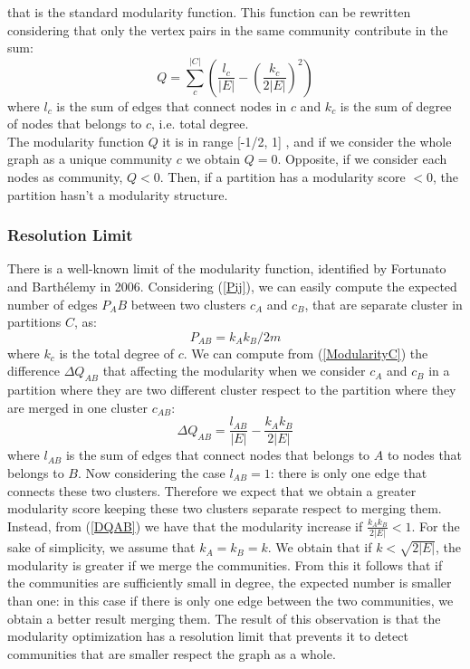 that is the standard modularity function. This function can be rewritten considering that only the vertex pairs in the same community contribute in the sum: 
\begin{equation}\label{ModularityC}
Q =  \sum_{c}^{|C|} \left( \frac{l_c}{|E|} - \left( \frac{k_c}{2|E|}\right) ^2 \right)
\end{equation}
where $l_c$ is the sum of edges that connect nodes in $c$ and $k_c$ is the sum of degree of nodes that belongs to $c$, i.e. total degree. \\
The modularity function $Q$ it is in range [-1/2, 1] \cite{bounds}, and if we consider the whole graph as a unique community $c$ we obtain $Q = 0$. Opposite, if we consider each nodes as community, $Q < 0$. Then, if a partition has a modularity score $<0$, the partition hasn't a modularity structure. 
\subsubsection{Resolution Limit}
There is a well-known limit of the modularity function, identified by Fortunato and Barthélemy \cite{resolution-limit} in 2006. Considering (\ref{Pij}), we can easily compute the expected number of edges $P_AB$ between two clusters $c_A$ and $c_B$, that are separate cluster in partitions $C$, as:
\begin{equation}
P_{AB} = k_A k_B /2m 
\end{equation}
where $k_c$ is the total degree of $c$.
We can compute from (\ref{ModularityC}) the difference $\Delta Q_{AB}$ that affecting the modularity when we consider $c_A$ and $c_B$ in a partition where they are two different cluster respect to the partition where they are merged in one cluster $c_{AB}$:
\begin{equation}\label{DQAB}
\Delta Q_{AB} = \frac{l_{AB}}{|E|}  - \frac{k_Ak_B}{2|E|}
\end{equation}
where $l_{AB}$ is the sum of edges that connect nodes that belongs to $A$ to nodes that belongs to $B$.
Now considering the case $l_{AB} = 1$: there is only one edge that connects these two clusters. Therefore we expect that we obtain a greater modularity score keeping these two clusters separate respect to merging them. Instead, from (\ref{DQAB}) we have that the modularity increase if  $\frac{k_Ak_B}{2|E|} < 1$. For the sake of simplicity, we assume that $k_A = k_B = k$. We obtain that if $k < \sqrt{2|E|}$, the modularity is greater if we merge the communities. From this it follows that if the communities are sufficiently small in degree, the expected number is smaller than one: in this case if there is only one edge between the two communities, we obtain a better result merging them. The result of this observation is that the modularity optimization has a resolution limit that prevents it to detect communities that are smaller respect the graph as a whole.
